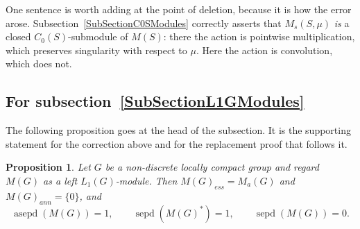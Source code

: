 \documentclass[11pt]{article}
\theoremstyle{plain}
\newtheorem{proposition}[theorem]{Proposition}
\theoremstyle{definition}
\DeclareMathOperator{\sepd}{sepd}
\DeclareMathOperator{\asepd}{asepd}
\begin{document}
One sentence is worth adding at the point of deletion, because it is how the
error arose. Subsection~\ref{SubSectionC0SModules} correctly asserts that
$M_s(S,\mu)$ \emph{is} a closed $C_0(S)$-submodule of $M(S)$: there the action is
pointwise multiplication, which preserves singularity with respect to $\mu$.
Here the action is convolution, which does not.

\subsection{For subsection~\ref{SubSectionL1GModules}}

The following proposition goes at the head of the subsection. It is the
supporting statement for the correction above and for the replacement proof
that follows it.

\begin{proposition}\label{AsympSepOfMeasAlg}
Let $G$ be a non-discrete locally compact group and regard $M(G)$ as a left
$L_1(G)$-module. Then ${M(G)}_{ess}=M_a(G)$ and ${M(G)}_{ann}= \{0 \}$, and
\[
\asepd(M(G))=1,\qquad \sepd(M{(G)}^*)=1,\qquad \sepd(M(G))=0 .
\]
\end{proposition}
\end{document}
